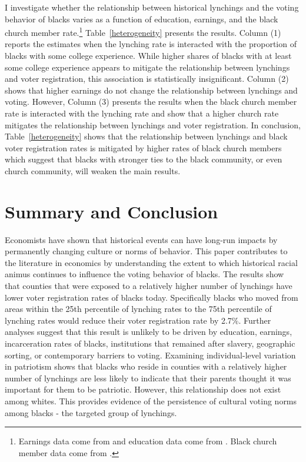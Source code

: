 \documentclass[AEJ, finalmode]{AEA}
\begin{document}
I investigate whether the relationship between historical lynchings and the voting behavior of blacks varies as a function of education, earnings, and the black church member rate.\footnote{Earnings data come from  and education data come from . Black church member data come from .} Table~\ref{heterogeneity} presents the results. Column (1) reports the estimates when the lynching rate is interacted with the proportion of blacks with some college experience. While higher shares of blacks with at least some college experience appears to mitigate the relationship between lynchings and voter registration, this association is statistically insignificant. Column (2) shows that higher earnings do not change the relationship between lynchings and voting. However, Column (3) presents the results when the black church member rate is interacted with the lynching rate and show that a higher church rate mitigates the relationship between lynchings and voter registration. In conclusion, Table~\ref{heterogeneity} shows that the relationship between lynchings and black voter registration rates is mitigated by higher rates of black church members which suggest that blacks with stronger ties to the black community, or even church community, will weaken the main results.


\section{Summary and Conclusion}
Economists have shown that historical events can have long-run impacts by permanently changing culture or norms of behavior. This paper contributes to the literature in economics by understanding the extent to which historical racial animus continues to influence the voting behavior of blacks. The results show that counties that were exposed to a relatively higher number of lynchings have lower voter registration rates of blacks today. Specifically blacks who moved from areas within the 25th percentile of lynching rates to the 75th percentile of lynching rates would reduce their voter registration rate by 2.7\%. Further analyses suggest that this result is unlikely to be driven by education, earnings, incarceration rates of blacks, institutions that remained after slavery, geographic sorting, or contemporary barriers to voting. Examining individual-level variation in patriotism shows that blacks who reside in counties with a relatively higher number of lynchings are less likely to indicate that their parents thought it was important for them to be patriotic. However, this relationship does not exist among whites. This provides evidence of the persistence of cultural voting norms among blacks - the targeted group of lynchings. 
\end{document}
